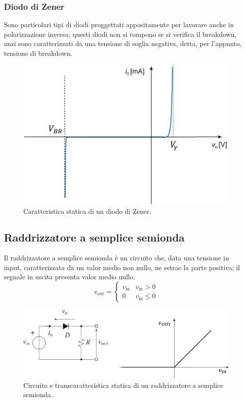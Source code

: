 \documentclass[a4paper]{article}
\begin{document}
			\subsubsection{Diodo di Zener}
				Sono particolari tipi di diodi proggettati appositamente per lavorare anche in polarizzazione inversa; questi diodi non si rompono se si verifica il breakdown, anzi sono caratterizzati da una tensione di soglia negativa, detta, per l'appunto, tensione di breakdown.
				\begin{figure}[h!]
					\centering
					\includegraphics[scale=0.7]{caratteristicaStaticaDiodoZener}
					\caption{Caratteristica statica di un diodo di Zener.}
					\label{fig:caratteristicaStaticaDiodoZener}
				\end{figure}
		\subsection{Raddrizzatore a semplice semionda}
			Il raddrizzatore a semplice semionda è un circuito che, data una tensione in input, caratterizzata da un valor medio non nullo, ne estrae la parte positiva; il segnale in uscita presenta valor medio nullo.
			\begin{equation*}
				v_{\mathrm{out}} =
				\begin{cases}
					v_{\mathrm{in}} & v_{\mathrm{in}} > 0 \\
					0 				& v_{\mathrm{in}} \le 0
				\end{cases}
			\end{equation*}
			\begin{figure}[h!]
				\centering
				\includegraphics[scale=0.7]{transcaratteristicaStaticaRaddrizzatoreASempliceSemionda}
				\caption{Circuito e transcaratteristica statica di un raddrizzatore a semplice semionda.}
				\label{fig:transcaratteristicaStaticaRaddrizzatoreASempliceSemionda}
			\end{figure}
\end{document}
